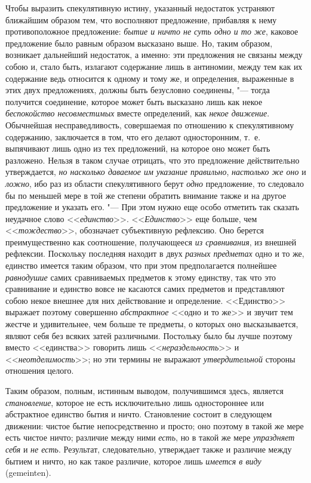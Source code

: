 Чтобы выразить спекулятивную истину, указанный недостаток устраняют
ближайшим образом тем, что восполняют предложение, прибавляя к нему
противоположное предложение: {\em бытие и ничто не суть
одно и то же}, каковое предложение было равным образом высказано выше. Но,
таким образом, возникает дальнейший недостаток, а именно: эти предложения
не связаны между собою и, стало быть, излагают содержание лишь в антиномии,
между тем как их содержание ведь относится к одному и тому же, и
определения, выраженные в этих двух предложениях, должны быть безусловно
соединены, "--- тогда получится соединение, которое может быть высказано лишь
как некое {\em беспокойство несовместимых} вместе
определений, как {\em некое движение}. Обычнейшая
несправедливость, совершаемая по отношению к спекулятивному содержанию,
заключается в том, что его делают односторонним, т.~е. выпячивают лишь одно
из тех предложений, на которое оно может быть разложено. Нельзя в таком
случае отрицать, что это предложение действительно утверждается,
{\em но насколько даваемое им указание правильно},
{\em настолько же оно} и
{\em ложно}, ибо раз из области спекулятивного берут
{\em одно} предложение, то следовало бы по меньшей мере
в той же степени обратить внимание также и на другое предложение и указать
его. "--- При этом нужно еще особо отметить так сказать неудачное слово
<<{\em единство}>>. <<{\em Единство}>>
еще больше, чем <<{\em тождество}>>, обозначает
субъективную рефлексию. Оно берется преимущественно как соотношение,
получающееся {\em из сравнивания}, из внешней
рефлексии. Поскольку последняя находит в двух
{\em разных предметах} одно и то же, единство имеется
таким образом, что при этом предполагается полнейшее
{\em равнодушие} самих сравниваемых предметов к этому
единству, так что это сравнивание и единство вовсе не касаются самих
предметов и представляют собою некое внешнее для них действование и
определение. <<Единство>> выражает поэтому совершенно
{\em абстрактное} <<одно и то же>> и звучит тем жестче и
удивительнее, чем больше те предметы, о которых оно высказывается, являют
себя без всяких затей различными. Постольку было бы лучше поэтому вместо
<<единства>> говорить лишь <<{\em нераздельность}>> и
<<{\em неотделимость}>>; но эти термины не выражают
{\em утвердительной} стороны отношения целого.

Таким образом, полным, истинным выводом, получившимся здесь, является
{\em становление}, которое не есть исключительно лишь
одностороннее или абстрактное единство бытия и ничто. Становление состоит в
следующем движении: чистое бытие непосредственно и просто; оно поэтому в
такой же мере есть чистое ничто; различие между ними
{\em есть}, но в такой же мере
{\em упраздняет себя} и {\em не
есть}. Результат, следовательно, утверждает также и различие между бытием и
ничто, но как такое различие, которое лишь {\em имеется
в виду} (gemeinten).

